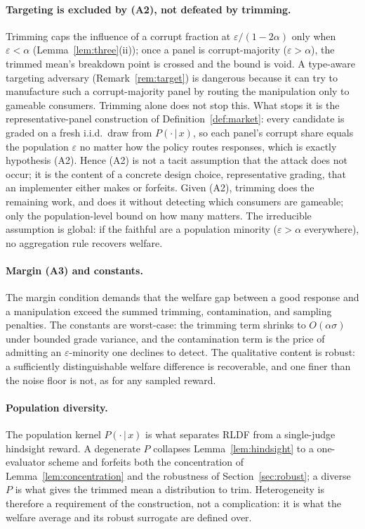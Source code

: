 \documentclass[11pt]{article}
\theoremstyle{plain}
\theoremstyle{definition}
\theoremstyle{remark}
\newcommand{\given}{\,\vert\,}
\newcommand{\eps}{\varepsilon}
\begin{document}
\paragraph{Targeting is excluded by (A2), not defeated by trimming.}
Trimming caps the influence of a corrupt fraction at $\eps/(1-2\alpha)$ only when $\eps<\alpha$
(Lemma~\ref{lem:three}(ii)); once a panel is corrupt-majority ($\eps>\alpha$), the trimmed
mean's breakdown point is crossed and the bound is void. A type-aware targeting adversary
(Remark~\ref{rem:target}) is dangerous because it can try to manufacture such a
corrupt-majority panel by routing the manipulation only to gameable consumers. Trimming alone
does not stop this. What stops it is the representative-panel construction of
Definition~\ref{def:market}: every candidate is graded on a fresh i.i.d.\ draw from
$P(\cdot\given x)$, so each panel's corrupt share equals the population $\eps$ no matter how the
policy routes responses, which is exactly hypothesis (A2). Hence (A2) is not a tacit assumption that the attack does not
occur; it is the content of a concrete design choice, representative grading, that an
implementer either makes or forfeits. Given (A2), trimming does the remaining work, and does it
without detecting which consumers are gameable; only the population-level bound on how many
matters. The irreducible assumption is global: if the faithful are a population minority
($\eps>\alpha$ everywhere), no aggregation rule recovers welfare.

\paragraph{Margin (A3) and constants.}
The margin condition demands that the welfare gap between a good response and a manipulation
exceed the summed trimming, contamination, and sampling penalties. The constants are worst-case:
the trimming term shrinks to $O(\alpha\sigma)$ under bounded grade variance, and the
contamination term is the price of admitting an $\eps$-minority one declines to detect. The
qualitative content is robust: a sufficiently distinguishable welfare difference is recoverable,
and one finer than the noise floor is not, as for any sampled reward.

\paragraph{Population diversity.}
The population kernel $P(\cdot\given x)$ is what separates RLDF from a single-judge hindsight
reward. A degenerate $P$ collapses Lemma~\ref{lem:hindsight} to a one-evaluator scheme and
forfeits both the concentration of Lemma~\ref{lem:concentration} and the robustness of
Section~\ref{sec:robust}; a diverse $P$ is what gives the trimmed mean a distribution to trim.
Heterogeneity is therefore a requirement of the construction, not a complication: it is what the
welfare average and its robust surrogate are defined over.
\end{document}
